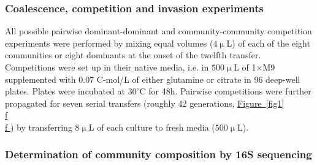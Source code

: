 \documentclass[a4paper,10pt]{article}
\newcommand{\figref}[2][]{%
  \hyperref[{#2}]{%
    Figure~\ref*{#2}%
    \ifx\\#1\\%
    \else
      #1%
    \fi
  }%
}
\begin{document}
\subsubsection*{Coalescence, competition and invasion experiments}
\label{methods:competitions}

All possible pairwise dominant-dominant and community-community
competition experiments
were performed by mixing equal volumes ($4\upmu$L) of each of the eight
communities or eight dominants at the onset of the twelfth transfer.
Competitions were set up in their native media,
i.e. in $500\upmu$L of 1$\times$M9 supplemented with 0.07 C-mol/L of
either glutamine or citrate in 96 deep-well plates.
Plates were incubated at $30^\circ$C for 48h.
Pairwise competitions were further propagated for seven serial transfers
(roughly 42 generations, \figref[f]{fig1}) by transferring $8\upmu$L of
each culture to fresh media ($500\upmu$L).

\subsubsection*{Determination of community composition by 16S sequencing}
\label{methods:sequencing}
\end{document}
